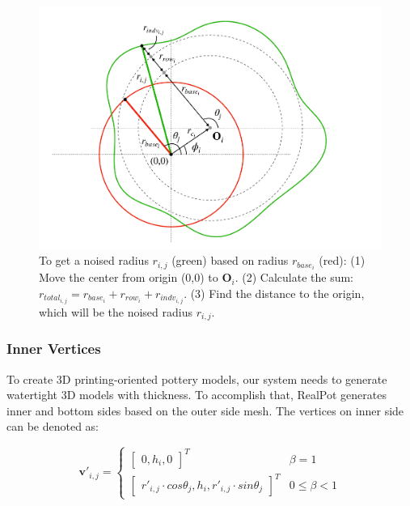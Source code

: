 \documentclass{svjour3}                     %
\begin{document}
\begin{figure}
\includegraphics[width=\textwidth]{fig5.pdf}
\caption{To get a noised radius $r_{i,j}$ (green) based on radius $r_{base_{i}}$ (red): (1) Move the center from origin (0,0) to $\mathbf{O}_{i}$. (2) Calculate the sum: $r_{total_{i,j}} = r_{base_{i}} + r_{row_{i}} + r_{indv_{i,j}}$. (3) Find the distance to the origin, which will be the noised radius $r_{i,j}$.}
\label{fig:noise}
\end{figure}

\subsubsection{Inner Vertices}

To create 3D printing-oriented pottery models, our system needs to generate watertight 3D models with thickness.
To accomplish that, RealPot generates inner and bottom sides based on the outer side mesh. The vertices on inner side can be denoted as:

\begin{equation}
\label{eqn:v'}
\mathbf{v'}_{i,j} 
= \begin{cases}
\begin{bmatrix}
0,h_{i},0
\end{bmatrix}^T & \beta=1
\\
\begin{bmatrix}
r'_{i,j} \cdot cos \theta_{j},
h_{i},
r'_{i,j} \cdot sin \theta_{j}
\end{bmatrix}^T & 0 \le \beta<1
\end{cases}
\end{equation}
\end{document}
